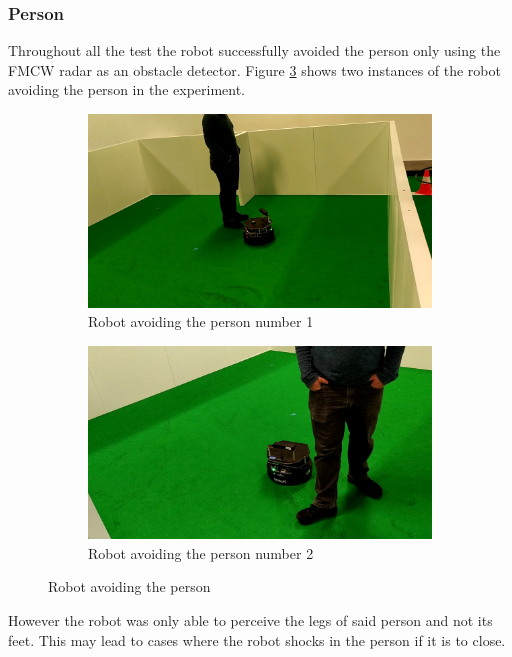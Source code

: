 \subsubsection{Person}
Throughout all the test the robot successfully avoided the person  only using the \ac{FMCW} \ac{radar} as an obstacle detector. Figure \ref{fig:exp3person} shows two instances of the robot avoiding the person in the experiment.
\begin{figure}[ht!]
  \centering
  \begin{subfigure}[b]{0.49\linewidth}
    \includegraphics[width=\linewidth]{imgs/chapter5/exp3person1.png}
     \caption{Robot avoiding the person number 1}
     \label{fig::exp3person1}
  \end{subfigure}
  \begin{subfigure}[b]{0.49\linewidth}
    \includegraphics[width=\linewidth]{imgs/chapter5/exp3person2.png}
    \caption{Robot avoiding the person  number 2}
    \label{fig::exp3person2}
  \end{subfigure}
  \caption{Robot avoiding the person }
  \label{fig:exp3person}
\end{figure}
However the robot was only able to perceive the legs of said person and not its feet. This may lead to cases where the robot shocks in the person if it is to close.

